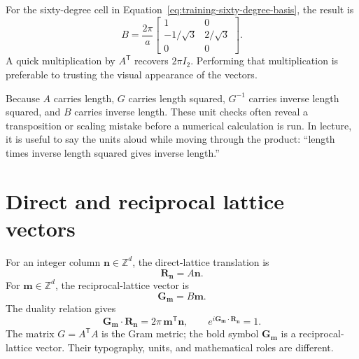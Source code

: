 For the sixty-degree cell in
Equation~\eqref{eq:training-sixty-degree-basis}, the result is
\begin{equation}
  B=\frac{2\pi}{a}
  \begin{bmatrix}
    1 & 0\\
    -1/\sqrt{3} & 2/\sqrt{3}\\
    0 & 0
  \end{bmatrix}.
  \label{eq:training-sixty-degree-dual}
\end{equation}
A quick multiplication by $A^{\mathsf T}$ recovers $2\pi I_2$. Performing that
multiplication is preferable to trusting the visual appearance of the vectors.

Because $A$ carries length, $G$ carries length squared, $G^{-1}$ carries inverse
length squared, and $B$ carries inverse length. These unit checks often reveal a
transposition or scaling mistake before a numerical calculation is run. In
lecture, it is useful to say the units aloud while moving through the product:
``length times inverse length squared gives inverse length.''

\section{Direct and reciprocal lattice vectors}

For an integer column $\mathbf n\in\mathbb Z^d$, the direct-lattice translation
is
\begin{equation}
  \mathbf R_{\mathbf n}=A\mathbf n.
  \label{eq:training-higher-dimensional-direct-translation}
\end{equation}
For $\mathbf m\in\mathbb Z^d$, the reciprocal-lattice vector is
\begin{equation}
  \mathbf G_{\mathbf m}=B\mathbf m.
  \label{eq:training-higher-dimensional-reciprocal-vector}
\end{equation}
The duality relation gives
\begin{equation}
  \mathbf G_{\mathbf m}\cdot\mathbf R_{\mathbf n}
  =2\pi\,\mathbf m^{\mathsf T}\mathbf n,
  \qquad
  e^{i\mathbf G_{\mathbf m}\cdot\mathbf R_{\mathbf n}}=1.
  \label{eq:training-higher-dimensional-lattice-duality}
\end{equation}
The matrix $G=A^{\mathsf T}A$ is the Gram metric; the bold symbol
$\mathbf G_{\mathbf m}$ is a reciprocal-lattice vector. Their typography,
units, and mathematical roles are different.

